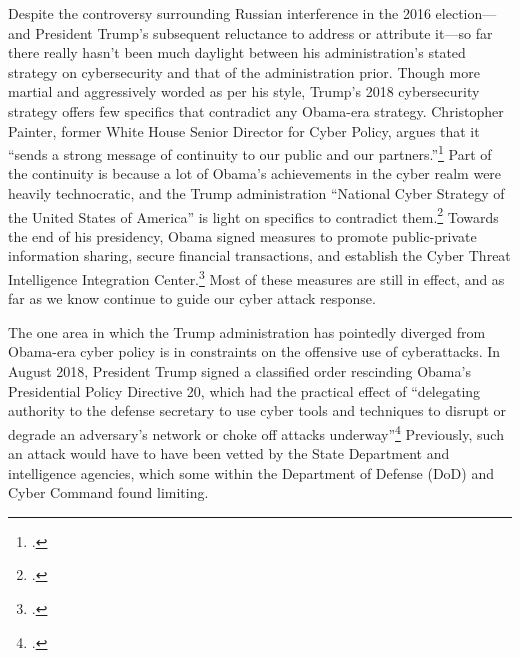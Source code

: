 \documentclass{memoir}
\begin{document}
\begin{refsegment}
Despite the controversy surrounding Russian interference in the 2016 election---and President Trump's subsequent reluctance to address or attribute it---so far there really hasn't been much daylight between his administration's stated strategy on cybersecurity and that of the administration prior. Though more martial and aggressively worded as per his style, Trump's 2018 cybersecurity strategy offers few specifics that contradict any Obama-era strategy. Christopher Painter, former White House Senior Director for Cyber Policy, argues that it ``sends a strong message of continuity to our public and our partners.''\footcite[Painter also served at the State Department for six years as the Coordinator for Cyber Issues, which at the time was an Assistant Secretary level position. Since then, its status within the department has fluctuated wildly. Rex Tillerson, Trump's first Secretary of State, announced that he would abolish the office and merge it into State's Bureau of Economic Affairs. Then, just a few months later, he proposed creating an entirely new department bureau with a Senate-confirmed Assistant Secretary, possibly in response to criticism of his first decision. Though current Secretary Mike Pompeo appears to have more interest in cyber policy, the State Department still has not reestablished a high level cyber position.]{painter_white_2018} Part of the continuity is because a lot of Obama's achievements in the cyber realm were heavily technocratic, and the Trump administration ``National Cyber Strategy of the United States of America'' is light on specifics to contradict them.\footcite{guest_blogger_white_2018} Towards the end of his presidency, Obama signed measures to promote public-private information sharing, secure financial transactions, and establish the Cyber Threat Intelligence Integration Center.\footcite[Among other actions taken during the Obama presidency, these were sufficenct for PolitiFact to update its 2013 rating of his cyber-enforcement actions to ``Promise Kept.'']{carroll_obama_2016} Most of these measures are still in effect, and as far as we know continue to guide our cyber attack response.

The one area in which the Trump administration has pointedly diverged from Obama-era cyber policy is in constraints on the offensive use of cyberattacks. In August 2018, President Trump signed a classified order rescinding Obama's Presidential Policy Directive 20, which had the practical effect of ``delegating authority to the defense secretary to use cyber tools and techniques to disrupt or degrade an adversary's network or choke off attacks underway''\footcite{nakashima_trump_2018} Previously, such an attack would have to have been vetted by the State Department and intelligence agencies, which some within the Department of Defense (DoD) and Cyber Command found limiting.


\end{refsegment}
\end{document}
